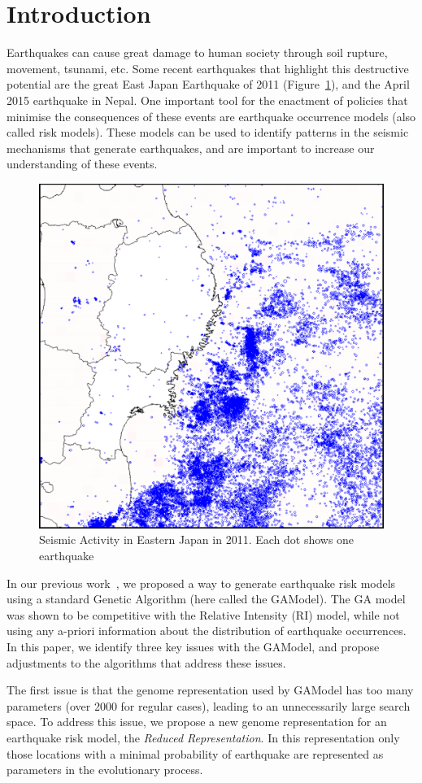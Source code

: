 \section{Introduction}\label{intro}

Earthquakes can cause great damage to human society through soil
rupture, movement, tsunami, etc. Some recent earthquakes that
highlight this destructive potential are the great East Japan
Earthquake of 2011 (Figure~\ref{GreatEastJapan}), and the
April 2015 earthquake in Nepal. One important tool for the enactment
of policies that minimise the consequences of these events are
earthquake occurrence models (also called risk models). These models
can be used to identify patterns in the seismic mechanisms that
generate earthquakes, and are important to increase our understanding
of these events.


\begin{figure}[]
\centering
\includegraphics[width=.45\textwidth]{img/earthquakes2011.png}
\caption{Seismic Activity in Eastern Japan in 2011. Each dot
  shows one earthquake}
\label{GreatEastJapan}
\end{figure}

In our previous work~\cite{ecta14}, we proposed a way to generate
earthquake risk models using a standard Genetic Algorithm (here called
the GAModel). The GA model was shown to be competitive with the
Relative Intensity (RI) model, while not using any a-priori
information about the distribution of earthquake occurrences. In this
paper, we identify three key issues with the GAModel, and propose
adjustments to the algorithms that address these issues.

The first issue is that the genome representation used by GAModel has
too many parameters (over 2000 for regular cases), leading to an
unnecessarily large search space. To address this issue, we propose a
new genome representation for an earthquake risk model, the
\emph{Reduced Representation}. In this representation only those
locations with a minimal probability of earthquake are represented as
parameters in the evolutionary process.

